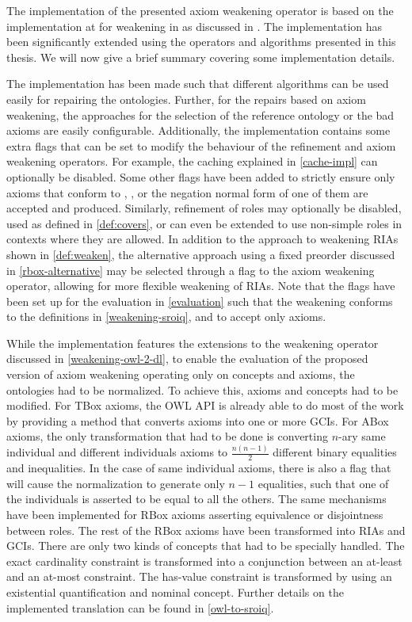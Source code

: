 
The implementation of the presented axiom weakening operator is based on the implementation at \cite{ontologyutils} for weakening in \ALC as discussed in \cite{troquard2018repairing}. The implementation has been significantly extended using the operators and algorithms presented in this thesis. We will now give a brief summary covering some implementation details.

The implementation has been made such that different algorithms can be used easily for repairing the ontologies. Further, for the repairs based on axiom weakening, the approaches for the selection of the reference ontology or the bad axioms are easily configurable. Additionally, the implementation contains some extra flags that can be set to modify the behaviour of the refinement and axiom weakening operators. For example, the caching explained in \cref{cache-impl} can optionally be disabled. Some other flags have been added to strictly ensure only axioms that conform to \ALC, \SROIQ, or the negation normal form of one of them are accepted and produced. Similarly, refinement of roles may optionally be disabled, used as defined in \cref{def:covers}, or can even be extended to use non-simple roles in contexts where they are allowed. In addition to the approach to weakening RIAs shown in \cref{def:weaken}, the alternative approach using a fixed preorder discussed in \cref{rbox-alternative} may be selected through a flag to the axiom weakening operator, allowing for more flexible weakening of RIAs. Note that the flags have been set up for the evaluation in \cref{evaluation} such that the weakening conforms to the definitions in \cref{weakening-sroiq}, and to accept only \SROIQ axioms.

While the implementation features the extensions to the weakening operator discussed in \cref{weakening-owl-2-dl}, to enable the evaluation of the proposed version of axiom weakening operating only on \SROIQ concepts and axioms, the ontologies had to be normalized. To achieve this, axioms and concepts had to be modified. For TBox axioms, the OWL API is already able to do most of the work by providing a method that converts axioms into one or more GCIs. For ABox axioms, the only transformation that had to be done is converting $n$-ary same individual and different individuals axioms to $\frac{n (n - 1)}{2}$ different binary equalities and inequalities. In the case of same individual axioms, there is also a flag that will cause the normalization to generate only $n - 1$ equalities, such that one of the individuals is asserted to be equal to all the others. The same mechanisms have been implemented for RBox axioms asserting equivalence or disjointness between roles. The rest of the RBox axioms have been transformed into RIAs and GCIs. There are only two kinds of concepts that had to be specially handled. The exact cardinality constraint is transformed into a conjunction between an at-least and an at-most constraint. The has-value constraint is transformed by using an existential quantification and nominal concept. Further details on the implemented translation can be found in \cref{owl-to-sroiq}.

